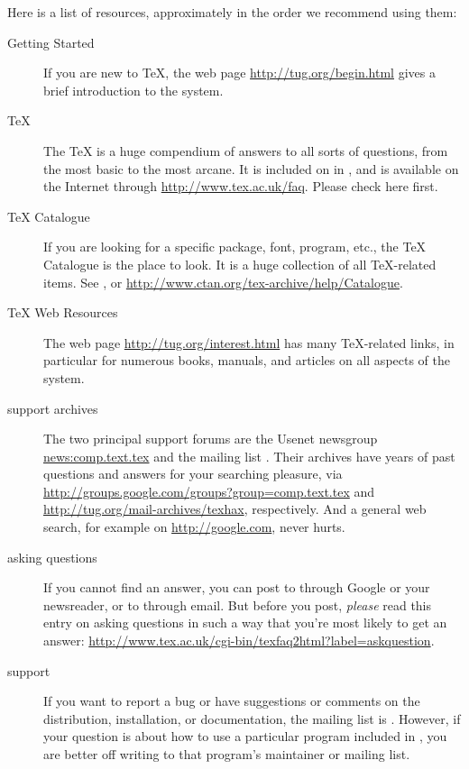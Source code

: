 \documentclass{article}
\begin{document}
Here is a list of resources, approximately in the order we recommend
using them:

\begin{description}
\item [Getting Started] If you are new to \TeX, the web page
\url{http://tug.org/begin.html} gives a brief introduction to the system.

\item [\TeX{} ] The \TeX{}  is a huge compendium of
answers to all sorts of questions, from the most basic to the most
arcane.  It is included on \TL{} in , and is
available on the Internet through \url{http://www.tex.ac.uk/faq}.
Please check here first.

\item [\TeX{} Catalogue] If you are looking for a specific package,
font, program, etc., the \TeX{} Catalogue is the place to look.  It is a
huge collection of all \TeX{}-related items.  See
, or
\url{http://www.ctan.org/tex-archive/help/Catalogue}.

\item [\TeX{} Web Resources] The web page
\url{http://tug.org/interest.html} has many \TeX{}-related links, in
particular for numerous books, manuals, and articles on all aspects of
the system.

\item [support archives] The two principal support forums are the
Usenet newsgroup \url{news:comp.text.tex} and the mailing list
.  Their archives have years of past
questions and answers for your searching pleasure, via
\url{http://groups.google.com/groups?group=comp.text.tex} and
\url{http://tug.org/mail-archives/texhax}, respectively.  And a general web
search, for example on \url{http://google.com}, never hurts.

\item [asking questions] If you cannot find an answer, you can post to
 through Google or your newsreader, or to
 through email.  But before you post,
\emph{please} read this  entry on asking questions in such a
way that you're most likely to get an answer:
\url{http://www.tex.ac.uk/cgi-bin/texfaq2html?label=askquestion}.

\item [\TL{} support] If you want to report a bug or have
suggestions or comments on the \TL{} distribution, installation, or
documentation, the mailing list is .  However,
if your question is about how to use a particular program included in
\TL{}, you are better off writing to that program's maintainer or
mailing list.

\end{description}
\end{document}
